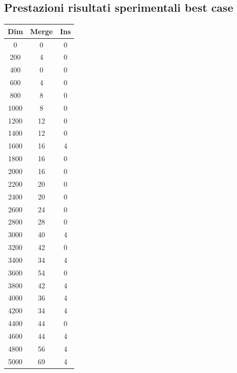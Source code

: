 \documentclass[12pt]{article}
\begin{document}
\subsection{Prestazioni risultati sperimentali best case}
\begin{center}
 \begin{tabular}{||c  c c||} 
 \hline
 Dim & Merge  & Ins \\ [0.5ex] 
\hline 
0 & 0 & 0 \\
\hline
200 & 4 & 0 \\
\hline
400 & 0 & 0 \\
\hline
600 & 4 & 0 \\
\hline
800 & 8 & 0 \\
\hline
1000 & 8 & 0 \\
\hline
1200 & 12 & 0 \\
\hline
1400 & 12 & 0 \\
\hline
1600 & 16 & 4 \\
\hline
1800 & 16 & 0 \\
\hline
2000 & 16 & 0 \\
\hline
2200 & 20 & 0 \\
\hline
2400 & 20 & 0 \\
\hline
2600 & 24 & 0 \\
\hline
2800 & 28 & 0 \\
\hline
3000 & 40 & 4 \\
\hline
3200 & 42 & 0 \\
\hline
3400 & 34 & 4 \\
\hline
3600 & 54 & 0 \\
\hline
3800 & 42 & 4 \\
\hline
4000 & 36 & 4 \\
\hline
4200 & 34 & 4 \\
\hline
4400 & 44 & 0 \\
\hline
4600 & 44 & 4 \\
\hline
4800 & 56 & 4 \\
\hline
5000 & 69 & 4 \\
\hline
\end{tabular}
\end{center}
\end{document}
